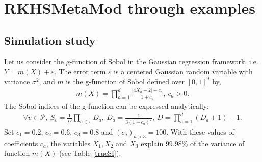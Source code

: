 \section{RKHSMetaMod through examples} \label{sec:examples}
\subsection{Simulation study}\label{subsec:simulstdy}
Let us consider the g-function of Sobol \citep{saltelli2009sensitivity} in the Gaussian regression framework, i.e. $Y=m(X)+\varepsilon$. The error term $\varepsilon$ is a centered Gaussian random variable with variance $\sigma^2$, and $m$ is the g-function of Sobol defined over $[0,1]^d$ by, 
\begin{align}
\label{gfct}
m(X)=\prod_{a=1}^d\frac{\vert 4X_a-2\vert +c_a}{1+c_a},\:c_a>0 .
\end{align}
The Sobol indices of the g-function can be expressed analytically:
\begin{align*}
\forall v\in\mathcal{P},\:S_v=\frac{1}{D}\prod_{a\in v}D_a,\:D_a=\frac{1}{3(1+c_a)^2},\:D=\prod_{a=1}^d(D_a+1)-1.
\end{align*} 
Set $c_1=0.2$, $c_2=0.6$, $c_3=0.8$ and $(c_a)_{a>3}=100$. With these values of coefficients $c_a$, the variables $X_1, X_2$ and $X_3$ explain $99.98\%$ of the variance of function $m(X)$ (see Table \ref{trueSI}).

